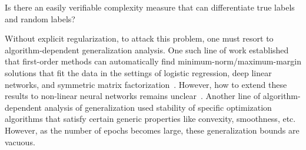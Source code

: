 \begin{question}\label{ques:gen}
	Is there an easily verifiable complexity measure that can differentiate true labels and random labels?
\end{question}

Without explicit regularization, to attack this problem,
one must resort to algorithm-dependent generalization analysis.
One such line of work established that first-order methods can automatically find minimum-norm/maximum-margin solutions that fit the data in the settings of logistic regression, deep linear networks, and symmetric matrix factorization~\citep{soudry2018implicit,gunasekar2018characterizing,gunasekar2018implicit,ji2018gradient,li2018algorithmic}.
However, how to extend these results to non-linear neural networks remains unclear~\citep{wei2018margin}.
Another line of algorithm-dependent analysis of generalization \citep{hardt2015train,mou2017generalization,chen2018stability} used stability of specific optimization algorithms  that satisfy certain generic properties like convexity, smoothness, etc.
However, as the number of epochs becomes large, these generalization bounds are vacuous. 




